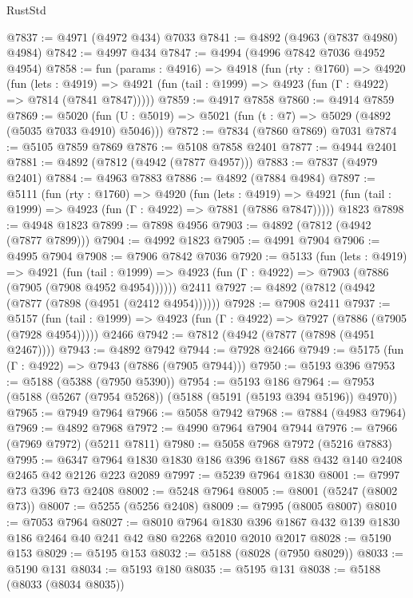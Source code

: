 \begin{lexlean}{RustStd}
\begin{coremodule}
@7837 := @4971 (@4972 @434) @7033
@7841 := @4892 (@4963 (@7837 @4980) @4984)
@7842 := @4997 @434
@7847 := @4994 (@4996 @7842 @7036 @4952 @4954)
@7858 := fun (params : @4916) =>
  @4918
    (fun (rty : @1760) =>
    @4920
      (fun (lets : @4919) =>
      @4921 (fun (tail : @1999) => @4923 (fun (Γ : @4922) => @7814 (@7841 @7847)))))
@7859 := @4917 @7858
@7860 := @4914 @7859
@7869 := @5020 (fun (U : @5019) => @5021 (fun (t : @7) => @5029 (@4892 (@5035 @7033 @4910) @5046)))
@7872 := @7834 (@7860 @7869) @7031
@7874 := @5105 @7859 @7869
@7876 := @5108 @7858 @2401
@7877 := @4944 @2401
@7881 := @4892 (@7812 (@4942 (@7877 @4957)))
@7883 := @7837 (@4979 @2401)
@7884 := @4963 @7883
@7886 := @4892 (@7884 @4984)
@7897 := @5111
    (fun (rty : @1760) =>
    @4920
      (fun (lets : @4919) =>
      @4921 (fun (tail : @1999) => @4923 (fun (Γ : @4922) => @7881 (@7886 @7847)))))
    @1823
@7898 := @4948 @1823
@7899 := @7898 @4956
@7903 := @4892 (@7812 (@4942 (@7877 @7899)))
@7904 := @4992 @1823
@7905 := @4991 @7904
@7906 := @4995 @7904
@7908 := @7906 @7842 @7036
@7920 := @5133
    (fun (lets : @4919) =>
    @4921
      (fun (tail : @1999) => @4923 (fun (Γ : @4922) => @7903 (@7886 (@7905 (@7908 @4952 @4954))))))
    @2411
@7927 := @4892 (@7812 (@4942 (@7877 (@7898 (@4951 (@2412 @4954))))))
@7928 := @7908 @2411
@7937 := @5157
    (fun (tail : @1999) => @4923 (fun (Γ : @4922) => @7927 (@7886 (@7905 (@7928 @4954)))))
    @2466
@7942 := @7812 (@4942 (@7877 (@7898 (@4951 @2467))))
@7943 := @4892 @7942
@7944 := @7928 @2466
@7949 := @5175 (fun (Γ : @4922) => @7943 (@7886 (@7905 @7944)))
@7950 := @5193 @396
@7953 := @5188 (@5388 (@7950 @5390))
@7954 := @5193 @186
@7964 := @7953 (@5188 (@5267 (@7954 @5268)) (@5188 (@5191 (@5193 @394 @5196)) @4970))
@7965 := @7949 @7964
@7966 := @5058 @7942
@7968 := @7884 (@4983 @7964)
@7969 := @4892 @7968
@7972 := @4990 @7964 @7904 @7944
@7976 := @7966 (@7969 @7972) (@5211 @7811)
@7980 := @5058 @7968 @7972 (@5216 @7883)
@7995 := @6347 @7964 @1830 @1830 @186 @396 @1867 @88 @432 @140 @2408 @2465 @42 @2126 @223 @2089
@7997 := @5239 @7964 @1830
@8001 := @7997 @73 @396 @73 @2408
@8002 := @5248 @7964
@8005 := @8001 (@5247 (@8002 @73))
@8007 := @5255 (@5256 @2408)
@8009 := @7995 (@8005 @8007)
@8010 := @7053 @7964
@8027 := @8010
    @7964
    @1830
    @396
    @1867
    @432
    @139
    @1830
    @186
    @2464
    @40
    @241
    @42
    @80
    @2268
    @2010
    @2010
    @2017
@8028 := @5190 @153
@8029 := @5195 @153
@8032 := @5188 (@8028 (@7950 @8029))
@8033 := @5190 @131
@8034 := @5193 @180
@8035 := @5195 @131
@8038 := @5188 (@8033 (@8034 @8035))

\end{coremodule}
\end{lexlean}
